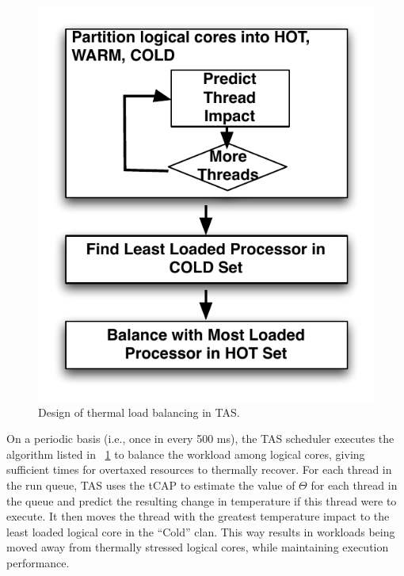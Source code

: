 \documentclass[times, 10pt,twocolumn]{IEEEtran}
\begin{document}
\begin{figure}[t] \centering
  \includegraphics[scale=0.7]{tbalance.pdf}
  \caption{Design of thermal load balancing in TAS.}
  \label{fig:thermbal}
\end{figure}

On a periodic basis (i.e., once in every 500 ms), the TAS scheduler executes the algorithm listed in \figurename~\ref{fig:thermbal} to balance the workload among logical cores, giving sufficient times for overtaxed resources to thermally recover. 
For each thread in the run queue, TAS uses the tCAP to estimate
the value of $\Theta$ for each thread in the queue and predict the
resulting change in temperature if this thread were to execute.  
It then moves the thread with the greatest temperature impact to the
least loaded logical core in the ``Cold'' clan.  
This way results in workloads being moved away
from thermally stressed logical cores, while maintaining execution performance.
\end{document}
